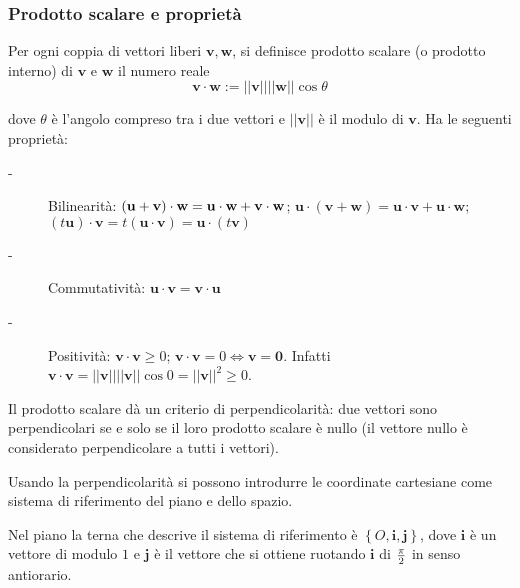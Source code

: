\documentclass{article}
\begin{document}
\subsubsection{Prodotto scalare e propriet\`{a}}

Per ogni coppia di vettori liberi $\mathbf{v,w}$, si definisce prodotto
scalare (o prodotto interno) di $\mathbf{v}$ e $\mathbf{w}$ il numero reale%
\begin{equation*}
\mathbf{v\cdot w}:=\left\vert \left\vert \mathbf{v}\right\vert \right\vert
\left\vert \left\vert \mathbf{w}\right\vert \right\vert \cos \theta
\end{equation*}

dove $\theta $ \`{e} l'angolo compreso tra i due vettori e $\left\vert
\left\vert \mathbf{v}\right\vert \right\vert $ \`{e} il modulo di $\mathbf{v}
$. Ha le seguenti propriet\`{a}:

\begin{description}
\item[-] Bilinearit\`{a}: $\left( \mathbf{u}+\mathbf{v}\right) \cdot \mathbf{%
w=u\cdot w+v\cdot w}$; $\mathbf{u}\cdot \left( \mathbf{v}+\mathbf{w}\right) =%
\mathbf{u\cdot v+u\cdot w}$; $\left( t\mathbf{u}\right) \cdot \mathbf{v}%
=t\left( \mathbf{u\cdot v}\right) =\mathbf{u}\cdot \left( t\mathbf{v}\right) 
$

\item[-] Commutativit\`{a}: $\mathbf{u\cdot v=v\cdot u}$

\item[-] Positivit\`{a}: $\mathbf{v\cdot v}\geq 0$; $\mathbf{v\cdot v}%
=0\Longleftrightarrow \mathbf{v=0}$. Infatti $\mathbf{v\cdot v}=\left\vert
\left\vert \mathbf{v}\right\vert \right\vert \left\vert \left\vert \mathbf{v}%
\right\vert \right\vert \cos 0=\left\vert \left\vert \mathbf{v}\right\vert
\right\vert ^{2}\geq 0$.
\end{description}

Il prodotto scalare d\`{a} un criterio di perpendicolarit\`{a}: due vettori
sono perpendicolari se e solo se il loro prodotto scalare \`{e} nullo (il
vettore nullo \`{e} considerato perpendicolare a tutti i vettori).

Usando la perpendicolarit\`{a} si possono introdurre le coordinate
cartesiane come sistema di riferimento del piano e dello spazio.

Nel piano la terna che descrive il sistema di riferimento \`{e} $\left\{ O,%
\mathbf{i,j}\right\} $, dove $\mathbf{i}$ \`{e} un vettore di modulo $1$ e $%
\mathbf{j}$ \`{e} il vettore che si ottiene ruotando $\mathbf{i}$ di $\frac{%
\pi }{2}$ in senso antiorario.
\end{document}
